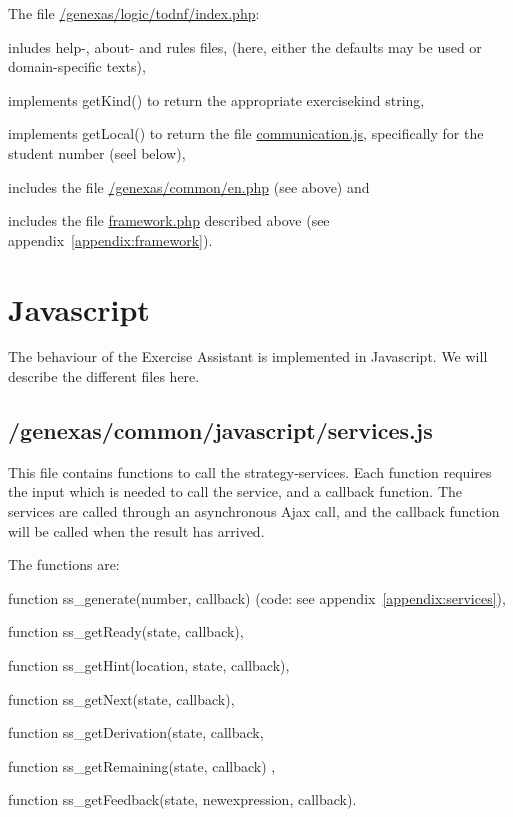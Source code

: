 \documentclass{article}
\begin{document}
The file \url{/genexas/logic/todnf/index.php}:
\begin{compactitem}
\item inludes  help-, about- and rules files, (here, either the defaults may be used or domain-specific texts),
\item implements getKind() to return the appropriate exercisekind string,
\item implements getLocal() to return the file \url{communication.js}, specifically for the student number (seel below),
\item includes the file \url{/genexas/common/en.php} (see above) and 
\item includes the file \url{framework.php} described above (see appendix~\ref{appendix:framework}).
\end{compactitem}

\section{Javascript}
The behaviour of the Exercise Assistant is implemented in Javascript. We will describe the different files here.

\subsection{/genexas/common/javascript/services.js}
This file contains functions to call the strategy-services. Each function requires the input which is needed to call the service, and a callback function. The services are called through an asynchronous Ajax call, and the callback function will be called when the result has arrived.

The functions are:
\begin{compactitem}
\item function ss\_generate(number, callback) (code: see appendix~\ref{appendix:services}),
\item function ss\_getReady(state, callback),
\item function ss\_getHint(location, state, callback),
\item function ss\_getNext(state, callback),
\item function ss\_getDerivation(state, callback,
\item function ss\_getRemaining(state, callback) ,
\item function ss\_getFeedback(state, newexpression, callback).
\end{compactitem}
\end{document}
